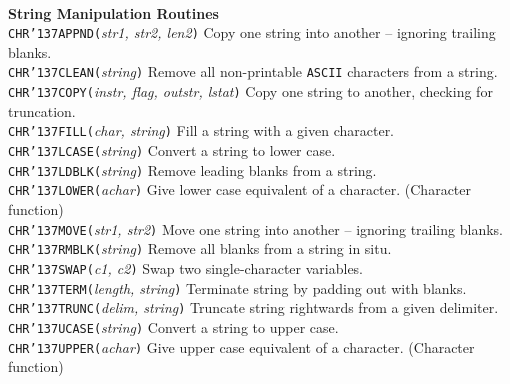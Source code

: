 \documentclass[twoside,11pt]{article}
\renewcommand{\_}{{\tt\char'137}}
\begin{document}
\begin{tabbing}
\\
{\bf String Manipulation Routines}\\
 {{\tt{CHR\_APPND(}}{\em str1, str2, len2}{\tt )}}\>
 Copy one string into another -- ignoring trailing blanks.\\
 {{\tt{CHR\_CLEAN(}}{\em string}{\tt )}}\>
 Remove all non-printable {\tt{ASCII}} characters from a string.\\
 {{\tt{CHR\_COPY(}}{\em instr, flag, outstr, lstat}{\tt )}}\>
 Copy one string to another, checking for truncation.\\
 {{\tt{CHR\_FILL(}}{\em char, string}{\tt )}}\>
 Fill a string with a given character.\\
 {{\tt{CHR\_LCASE(}}{\em string}{\tt )}}\>
 Convert a string to lower case.\\
 {{\tt{CHR\_LDBLK(}}{\em string}{\tt )}}\>
 Remove leading blanks from a string.\\
 {{\tt{CHR\_LOWER(}}{\em achar}{\tt )}}\>
 Give lower case equivalent of a character. (Character function)\\
 {{\tt{CHR\_MOVE(}}{\em str1, str2}{\tt )}}\>
 Move one string into another -- ignoring trailing blanks.\\
 {{\tt{CHR\_RMBLK(}}{\em string}{\tt )}}\>
 Remove all blanks from a string in situ.\\
 {{\tt{CHR\_SWAP(}}{\em c1, c2}{\tt )}}\>
 Swap two single-character variables.\\
 {{\tt{CHR\_TERM(}}{\em length, string}{\tt )}}\>
 Terminate string by padding out with blanks.\\
 {{\tt{CHR\_TRUNC(}}{\em delim, string}{\tt )}}\>
 Truncate string rightwards from a given delimiter.\\
 {{\tt{CHR\_UCASE(}}{\em string}{\tt )}}\>
 Convert a string to upper case.\\
 {{\tt{CHR\_UPPER(}}{\em achar}{\tt )}}\>
 Give upper case equivalent of a character. (Character function)
\end{tabbing}
\end{document}
